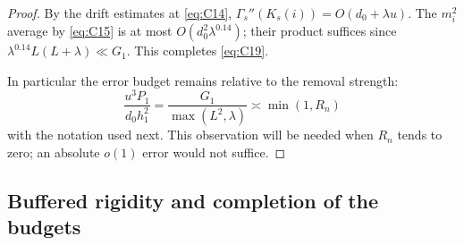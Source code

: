 \begin{proof}
By the drift estimates at \eqref{eq:C14}, \(\Gamma_s''(K_s(i))=O(d_0+\lambda u)\). The \(m_i^2\) average by \eqref{eq:C15} is at most \(O(d_0^2\lambda^{0.14})\); their product suffices since \(\lambda^{0.14}L(L+\lambda)\ll G_1\). This completes \eqref{eq:C19}.

In particular the error budget remains relative to the removal strength:
\[
 \frac{u^3P_1}{d_0h_1^2}
   =\frac{G_1}{\max(L^2,\lambda)}
   \asymp\min(1,R_n)
\]
with the notation used next.  This observation will be needed when
\(R_n\) tends to zero; an absolute \(o(1)\) error would not suffice.
\end{proof}




\subsection{Buffered rigidity and completion of the budgets}


